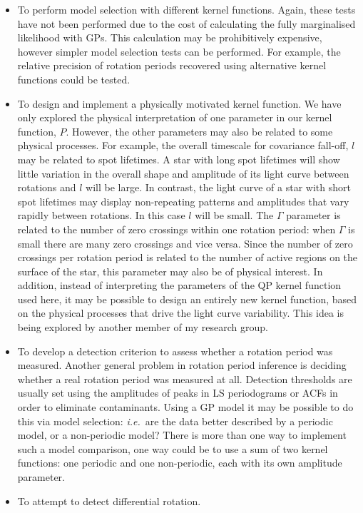 \documentclass[useAMS, usenatbib, preprint, 12pt]{aastex}
\newcommand{\ie}{{\it i.e.}}
\begin{document}
\begin{itemize}
\item{To perform model selection with different kernel functions. Again, these
tests have not been performed due to the cost of calculating the fully
marginalised likelihood with GPs. This calculation may be prohibitively
expensive, however simpler model selection tests can be performed. For
example, the relative precision of rotation periods recovered using
alternative kernel functions could be tested.}
\item{To design and implement a physically motivated kernel function. We have
only explored the physical interpretation of one parameter in our kernel
function, $P$.
However, the other parameters may also be related to some physical processes.
For example, the overall timescale for covariance fall-off, $l$ may be
related to spot lifetimes.
A star with long spot lifetimes will show little variation in the overall
shape and amplitude of its light curve between rotations and $l$ will be
large.
In contrast, the light curve of a star with short spot lifetimes may display
non-repeating patterns and amplitudes that vary rapidly between rotations.
In this case $l$ will be small.
The $\Gamma$ parameter is related to the number of zero crossings within one
rotation period: when $\Gamma$ is small there are many zero crossings and
vice versa.
Since the number of zero crossings per rotation period is related to the
number of active regions on the surface of the star, this parameter may also
be of physical interest.
In addition, instead of interpreting the parameters of the QP kernel function
used here, it may be possible to design an entirely new kernel function, based
on the physical processes that drive the light curve variability.
This idea is being explored by another member of my research group.}
\item{To develop a detection criterion to assess whether a rotation period was
measured.
Another general problem in rotation period inference is deciding whether a
real rotation period was measured at all.
Detection thresholds are usually set using the amplitudes of peaks in LS
periodograms or ACFs in order to eliminate contaminants.
Using a GP model it may be possible to do this via model selection: \ie\ are
the data better described by a periodic model, or a non-periodic model?
There is more than one way to implement such a model comparison, one way could
be to use a sum of two kernel functions: one periodic and one non-periodic,
each with its own amplitude parameter.}
\item{To attempt to detect differential rotation.
}
\end{itemize}
\end{document}
